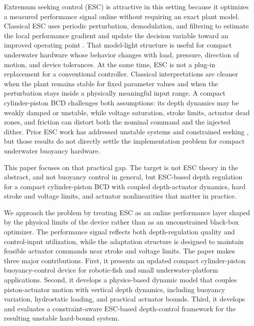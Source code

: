 ﻿\documentclass[subscriptcorrection,upint,varvw,barcolor=Goldenrod3,mathalfa=cal=euler,balance,hyphenate,french,pdf-a]{asmejour}
\begin{document}
Extremum seeking control (ESC) is attractive in this setting because it optimizes a measured performance signal online without requiring an exact plant model. Classical ESC uses periodic perturbation, demodulation, and filtering to estimate the local performance gradient and update the decision variable toward an improved operating point \cite{krstic2000stability,scheinker2024survey}. That model-light structure is useful for compact underwater hardware whose behavior changes with load, pressure, direction of motion, and device tolerances.
At the same time, ESC is not a plug-in replacement for a conventional controller. Classical interpretations are cleaner when the plant remains stable for fixed parameter values and when the perturbation stays inside a physically meaningful input range. A compact cylinder-piston BCD challenges both assumptions: its depth dynamics may be weakly damped or unstable, while voltage saturation, stroke limits, actuator dead zones, and friction can distort both the nominal command and the injected dither. Prior ESC work has addressed unstable systems \cite{zhang2007unstable,radenkovic2018adaptive} and constrained seeking \cite{dehaan2005state,tan2013constrained,guay2015constrained,labar2019barrier}, but those results do not directly settle the implementation problem for compact underwater buoyancy hardware.

This paper focuses on that practical gap. The target is not ESC theory in the abstract, and not buoyancy control in general, but ESC-based depth regulation for a compact cylinder-piston BCD with coupled depth-actuator dynamics, hard stroke and voltage limits, and actuator nonlinearities that matter in practice.

We approach the problem by treating ESC as an online performance layer shaped by the physical limits of the device rather than as an unconstrained black-box optimizer. The performance signal reflects both depth-regulation quality and control-input utilization, while the adaptation structure is designed to maintain feasible actuator commands near stroke and voltage limits.
The paper makes three major contributions. First, it presents an updated compact cylinder-piston buoyancy-control device for robotic-fish and small underwater-platform applications. Second, it develops a physics-based dynamic model that couples piston-actuator motion with vertical depth dynamics, including buoyancy variation, hydrostatic loading, and practical actuator bounds. Third, it develops and evaluates a constraint-aware ESC-based depth-control framework for the resulting unstable hard-bound system.
\end{document}
